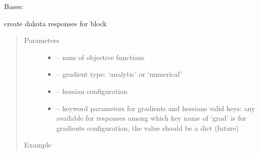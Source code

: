 \documentclass[letterpaper,10pt,english]{sphinxmanual}
\begin{document}
\begin{fulllineitems}
\label{\detokenize{src/apidocs/dakutils:genopt.dakutils.DakotaResponses}}
Bases: \href{https://docs.python.org/2/library/functions.html\#object}{}

create dakota responses for  block
\begin{quote}\begin{description}
\item[{Parameters}] \leavevmode\begin{itemize}
\item {} 
 -- num of objective functions

\item {} 
 -- gradient type: `analytic' or `numerical'

\item {} 
 -- hessian configuration

\item {} 
 -- keyword parameters for gradients and hessians
valid keys: any available for responses
among which key name of `grad' is for gradients configuration, 
the value should be a dict (future)

\end{itemize}

\item[{Example}] \leavevmode
\end{description}\end{quote}


\end{fulllineitems}
\end{document}
